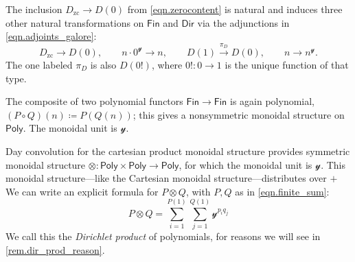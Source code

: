 \documentclass[11pt, article, one side]{memoir}
\theoremstyle{theorem}
\theoremstyle{definition}
\theoremstyle{remark}
\newcommand{\Cat}[1]{\mathsf{#1}}%
\newcommand{\To}[1]{\xrightarrow{#1}}
\newcommand{\fin}{\Cat{Fin}}
\newcommand{\zero}[1]{#1_\text{zc}}
\newcommand{\yon}{\mathcal{y}}
\newcommand{\poly}{\Cat{Poly}}
\newcommand{\dir}{\Cat{Dir}}
\newcommand{\mdot}{{\cdot}}
\begin{document}
The inclusion $\zero{D}\to D(0)$ from \cref{eqn.zerocontent} is natural and induces three other natural transformations on $\fin$ and $\dir$ via the adjunctions in \cref{eqn.adjoints_galore}:
\begin{equation}\label{eqn.obtain_pi}
\zero{D}\to D(0),\qquad
n\mdot0^\yon\to n,\qquad
D(1)\To{\pi_D} D(0),\qquad
n\to n^\yon.
\end{equation}
The one labeled $\pi_D$ is also $D(0!)$, where $0!\colon 0\to 1$ is the unique function of that type.

The composite of two polynomial functors $\fin\to\fin$ is again polynomial, $(P\circ Q)(n)\coloneqq P(Q(n))$; this gives a nonsymmetric monoidal structure on $\poly$. The monoidal unit is $\yon$.

Day convolution for the cartesian product monoidal structure provides symmetric monoidal structure $\otimes\colon\poly\times\poly\to\poly$, for which the monoidal unit is $\yon$. This monoidal structure---like the Cartesian monoidal structure---distributes over $+$ We can write an explicit formula for $P\otimes Q$, with $P,Q$ as in \cref{eqn.finite_sum}:
\begin{equation}\label{eqn.dir_monoidal_product}
  P\otimes
  Q=
  \sum_{i=1}^{P(1)}\sum_{j=1}^{Q(1)}\yon^{p_iq_j}
\end{equation}
We call this the \emph{Dirichlet product} of polynomials, for reasons we will see in \cref{rem.dir_prod_reason}.
\end{document}
